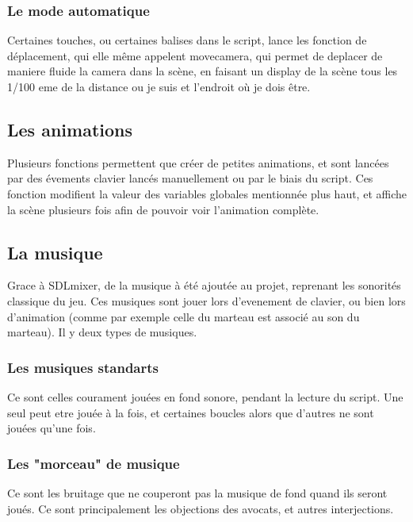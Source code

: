 	\subsubsection{Le mode automatique}
	Certaines touches, ou certaines balises dans le script, lance les fonction de déplacement, qui elle même appelent movecamera, qui permet de deplacer de maniere fluide la camera dans la scène, en faisant un display de la scène tous les 1/100 eme de la distance ou je suis et l'endroit où je dois être.
\subsection{Les animations}
	Plusieurs fonctions permettent que créer de petites animations, et sont lancées par des évements clavier lancés manuellement ou par le biais du script. Ces fonction modifient la valeur des variables globales mentionnée plus haut, et affiche la scène plusieurs fois afin de pouvoir voir l'animation complète.
\subsection{La musique}
	Grace à SDLmixer, de la musique à été ajoutée au projet, reprenant les sonorités classique du jeu. Ces musiques sont jouer lors d'evenement de clavier, ou bien lors d'animation (comme par exemple celle du marteau est associé au son du marteau). Il y deux types de musiques.
	\subsubsection{Les musiques standarts}
	Ce sont celles courament jouées en fond sonore, pendant la lecture du script. Une seul peut etre jouée à la fois, et certaines boucles alors que d'autres ne sont jouées qu'une fois.
	\subsubsection{Les "morceau" de musique}
	Ce sont les bruitage que ne couperont pas la musique de fond quand ils seront joués. Ce sont principalement les objections des avocats, et autres interjections.
	